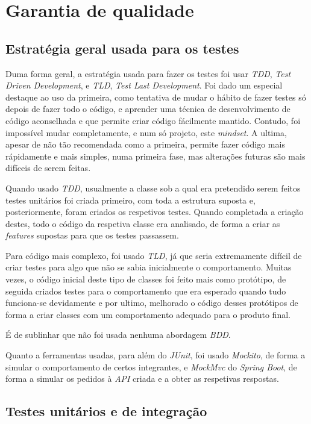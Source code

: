 
\chapter{Garantia de qualidade}

\section{Estratégia geral usada para os testes}
Duma forma geral, a estratégia usada para fazer os testes foi usar \textit{TDD}, \textit{Test Driven Development}, e \textit{TLD}, \textit{Test Last Development}. Foi dado um especial destaque ao uso da primeira, como tentativa de mudar o hábito de fazer testes só depois de fazer todo o código, e aprender uma técnica de desenvolvimento de código aconselhada e que permite criar código fácilmente mantido. Contudo, foi impossível mudar completamente, e num só projeto, este \textit{mindset}. A ultima, apesar de não tão recomendada como a primeira, permite fazer código mais rápidamente e mais simples, numa primeira fase, mas alterações futuras são mais difíceis de serem feitas.

Quando usado \textit{TDD}, usualmente a classe sob a qual era pretendido serem feitos testes unitários foi criada primeiro, com toda a estrutura suposta e, posteriormente, foram criados os respetivos testes. Quando completada a criação destes, todo o código da respetiva classe era analisado, de forma a criar as \textit{features} supostas para que os testes passassem.

Para código mais complexo, foi usado \textit{TLD}, já que seria extremamente difícil de criar testes para algo que não se sabia inicialmente o comportamento. Muitas vezes, o código inicial deste tipo de classes foi feito mais como protótipo, de seguida criados testes para o comportamento que era esperado quando tudo funciona-se devidamente e por ultimo, melhorado o código desses protótipos de forma a criar classes com um comportamento adequado para o produto final.

É de sublinhar que não foi usada nenhuma abordagem \textit{BDD}.

Quanto a ferramentas usadas, para além do \textit{JUnit}, foi usado \textit{Mockito}, de forma a simular o comportamento de certos integrantes, e \textit{MockMvc} do \textit{Spring Boot}, de forma a simular os pedidos à \textit{API} criada e a obter as respetivas respostas.


\section{Testes unitários e de integração}

